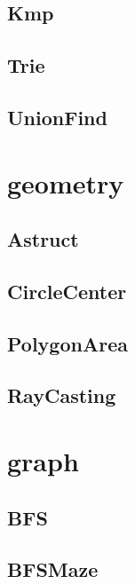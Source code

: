 \subsection{ Kmp}
\raggedbottom
\hrulefill
\subsection{ Trie}
\raggedbottom
\hrulefill
\subsection{ UnionFind}
\raggedbottom
\hrulefill

\section{geometry}
\subsection{ Astruct}
\raggedbottom
\hrulefill
\subsection{ CircleCenter}
\raggedbottom
\hrulefill
\subsection{ PolygonArea}
\raggedbottom
\hrulefill
\subsection{ RayCasting}
\raggedbottom
\hrulefill

\section{graph}
\subsection{ BFS}
\raggedbottom
\hrulefill
\subsection{ BFSMaze}
\raggedbottom
\hrulefill
